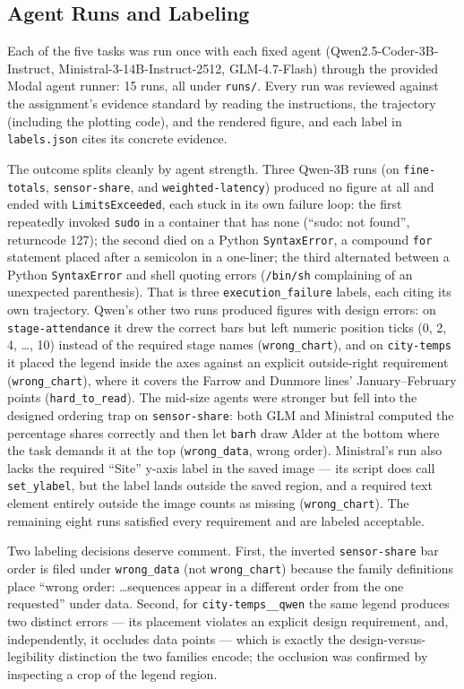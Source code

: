 \documentclass[11pt]{article}
\begin{document}
\subsection{Agent Runs and Labeling}
Each of the five tasks was run once with each fixed agent
(Qwen2.5-Coder-3B-Instruct, Ministral-3-14B-Instruct-2512, GLM-4.7-Flash)
through the provided Modal agent runner: 15 runs, all under \texttt{runs/}.
Every run was reviewed against the assignment's evidence standard by reading
the instructions, the trajectory (including the plotting code), and the
rendered figure, and each label in \texttt{labels.json} cites its concrete
evidence.

The outcome splits cleanly by agent strength. Three Qwen-3B runs (on
\texttt{fine-totals}, \texttt{sensor-share}, and
\texttt{weighted-latency}) produced no figure at all and ended with
\texttt{LimitsExceeded}, each stuck in its own failure loop: the first
repeatedly invoked \texttt{sudo} in a container that has none (``sudo: not
found'', returncode 127); the second died on a Python
\texttt{SyntaxError}, a compound \texttt{for} statement placed after a
semicolon in a one-liner; the third alternated between a Python
\texttt{SyntaxError} and shell quoting errors (\texttt{/bin/sh}
complaining of an unexpected parenthesis). That is three
\texttt{execution\_failure} labels, each citing its own trajectory. Qwen's
other two runs produced figures with design errors: on
\texttt{stage-attendance} it drew the correct bars but left numeric
position ticks (0, 2, 4, \ldots, 10) instead of the required stage names
(\texttt{wrong\_chart}), and on \texttt{city-temps} it placed the legend
inside the axes against an explicit outside-right requirement
(\texttt{wrong\_chart}), where it covers the Farrow and Dunmore lines'
January--February points (\texttt{hard\_to\_read}). The mid-size agents
were stronger but fell into the designed ordering trap on
\texttt{sensor-share}: both GLM and Ministral computed the percentage
shares correctly and then let \texttt{barh} draw Alder at the bottom where
the task demands it at the top (\texttt{wrong\_data}, wrong order).
Ministral's run also lacks the required ``Site'' y-axis label in the saved
image --- its script does call \texttt{set\_ylabel}, but the label lands
outside the saved region, and a required text element entirely outside the
image counts as missing (\texttt{wrong\_chart}). The remaining eight runs
satisfied every requirement and are labeled acceptable.

Two labeling decisions deserve comment. First, the inverted
\texttt{sensor-share} bar order is filed under \texttt{wrong\_data} (not
\texttt{wrong\_chart}) because the family definitions place ``wrong order:
\ldots sequences appear in a different order from the one requested'' under
data. Second, for \texttt{city-temps\_\_qwen} the same legend produces two
distinct errors --- its placement violates an explicit design requirement,
and, independently, it occludes data points --- which is exactly the
design-versus-legibility distinction the two families encode; the occlusion
was confirmed by inspecting a crop of the legend region.
\end{document}
